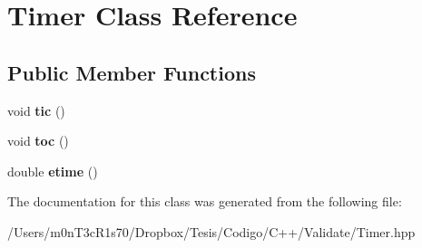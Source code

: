 \hypertarget{class_timer}{}\section{Timer Class Reference}
\label{class_timer}
\subsection*{Public Member Functions}
\begin{DoxyCompactItemize}
\item 
\hypertarget{class_timer_a53d0ae26630a0e23ce920bcd77276f77}{}\label{class_timer_a53d0ae26630a0e23ce920bcd77276f77} 
void {\bfseries tic} ()
\item 
\hypertarget{class_timer_a15bebd2084ba06753d2c93b8471c4963}{}\label{class_timer_a15bebd2084ba06753d2c93b8471c4963} 
void {\bfseries toc} ()
\item 
\hypertarget{class_timer_aaad736baa062b1502e1788821b2650b0}{}\label{class_timer_aaad736baa062b1502e1788821b2650b0} 
double {\bfseries etime} ()
\end{DoxyCompactItemize}


The documentation for this class was generated from the following file\+:\begin{DoxyCompactItemize}
\item 
/\+Users/m0n\+T3c\+R1s70/\+Dropbox/\+Tesis/\+Codigo/\+C++/\+Validate/Timer.\+hpp\end{DoxyCompactItemize}
